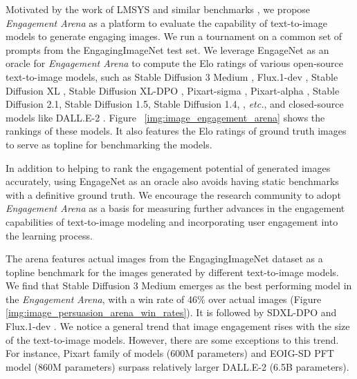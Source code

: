  
 
 Motivated by the work of LMSYS and similar benchmarks \cite{chiang2024chatbotarenaopenplatform}, we propose \textit{Engagement Arena} as a platform to evaluate the capability of text-to-image models to generate engaging images. We run a tournament on a common set of prompts from the EngagingImageNet test set. We leverage EngageNet as an oracle for \textit{Engagement Arena} to compute the Elo ratings of various open-source text-to-image models, such as Stable Diffusion 3 Medium \cite{esser2024scaling}, Flux.1-dev \cite{blackforestlabs2024}, Stable Diffusion XL \cite{podell2023sdxl}, Stable Diffusion XL-DPO \cite{wallace2024diffusion}, Pixart-sigma \cite{chen2024pixart}, Pixart-alpha \cite{chen2024pixartalpha}, Stable Diffusion 2.1, Stable Diffusion 1.5, Stable Diffusion 1.4, \cite{rombach2022high}, \textit{etc.}, and closed-source models like DALL.E-2 \cite{ramesh2022hierarchical}. Figure ~\ref{img:image_engagement_arena} shows the rankings of these models. It also features the Elo ratings of ground truth images to serve as topline for benchmarking the models.
 
 In addition to helping to rank the engagement potential of generated images accurately, using EngageNet as an oracle also avoids having static benchmarks with a definitive ground truth. We encourage the research community to adopt \textit{Engagement Arena} as a basis for measuring further advances in the engagement capabilities of text-to-image modeling and incorporating user engagement into the learning process. 
 
 The arena features actual images from the EngagingImageNet dataset as a topline benchmark for the images generated by different text-to-image models. We find that Stable Diffusion 3 Medium \cite{esser2024scaling} emerges as the best performing model in the \textit{Engagement Arena}, with a win rate of 46\% over actual images (Figure \ref{img:image_persuasion_arena_win_rates}). It is followed by SDXL-DPO \cite{wallace2024diffusion} and Flux.1-dev \cite{blackforestlabs2024}. We notice a general trend that image engagement rises with the size of the text-to-image models. However, there are some exceptions to this trend. For instance, Pixart family of models (600M parameters) and EOIG-SD PFT model (860M parameters) surpass relatively larger DALL.E-2 (6.5B parameters).

